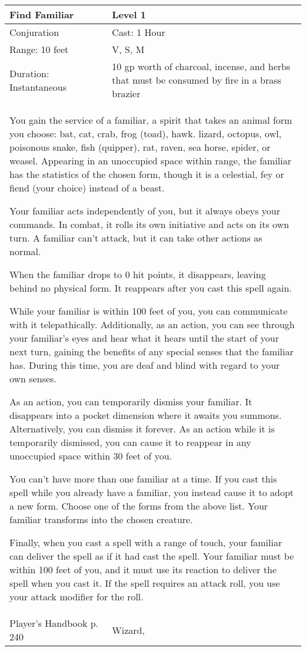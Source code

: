 \documentclass[11pt]{report}
\begin{document}
\begin{table}[H]
	\begin{tabular}{||p{6cm}|p{6cm}||}
		\hline\hline
		\bf{Find Familiar} & Level 1\\ \hline
		Conjuration & Cast: 1 Hour\\ \hline
		Range: 10 feet & V, S, M\\ \hline
		Duration: Instantaneous & 10 gp worth of charcoal, incense, and herbs that must be consumed by fire in a brass brazier\\ \hline
		\multicolumn{2}{||p{12cm}||}{You gain the service of a familiar, a spirit that takes an animal form you choose: bat, cat, crab, frog (toad), hawk. lizard, octopus, owl, poisonous snake, fish (quipper), rat, raven, sea horse, spider, or weasel. Appearing in an unoccupied space within range, the familiar has the statistics of the chosen form, though it is a celestial, fey or fiend (your choice) instead of a beast. 

Your familiar acts independently of you, but it always obeys your commands. In combat, it rolls its own initiative and acts on its own turn. A familiar can’t attack, but it can take other actions as normal. 

When the familiar drops to 0 hit points, it disappears, leaving behind no physical form. It reappears after you cast this spell again. 

While your familiar is within 100 feet of you, you can communicate with it telepathically. Additionally, as an action, you can see through your familiar’s eyes and hear what it hears until the start of your next turn, gaining the benefits of any special senses that the familiar has. During this time, you are deaf and blind with regard to your own senses. 

As an action, you can temporarily dismiss your familiar. It disappears into a pocket dimension where it awaits you summons. Alternatively, you can dismiss it forever. As an action while it is temporarily dismissed, you can cause it to reappear in any unoccupied space within 30 feet of you. 

You can’t have more than one familiar at a time. If you cast this spell while you already have a familiar, you instead cause it to adopt a new form. Choose one of the forms from the above list. Your familiar transforms into the chosen creature. 

Finally, when you cast a spell with a range of touch, your familiar can deliver the spell as if it had cast the spell. Your familiar must be within 100 feet of you, and it must use its reaction to deliver the spell when you cast it. If the spell requires an attack roll, you use your attack modifier for the roll.}\\ \hline
Player's Handbook p. 240 & Wizard, \\ \hline\hline
	\end{tabular}
\end{table}
\end{document}
